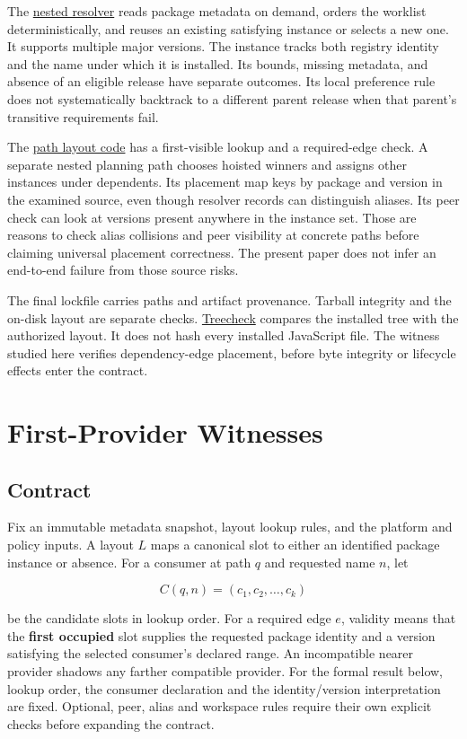 \documentclass[
  11pt,
  letterpaper,
]{article}
\begin{document}
The \href{../../crates/jhol-core/src/jagr_nest.rs}{nested resolver}
reads package metadata on demand, orders the worklist deterministically,
and reuses an existing satisfying instance or selects a new one. It
supports multiple major versions. The instance tracks both registry
identity and the name under which it is installed. Its bounds, missing
metadata, and absence of an eligible release have separate outcomes. Its
local preference rule does not systematically backtrack to a different
parent release when that parent's transitive requirements fail.

The \href{../../crates/jhol-core/src/layout.rs}{path layout code} has a
first-visible lookup and a required-edge check. A separate nested
planning path chooses hoisted winners and assigns other instances under
dependents. Its placement map keys by package and version in the
examined source, even though resolver records can distinguish aliases.
Its peer check can look at versions present anywhere in the instance
set. Those are reasons to check alias collisions and peer visibility at
concrete paths before claiming universal placement correctness. The
present paper does not infer an end-to-end failure from those source
risks.

The final lockfile carries paths and artifact provenance. Tarball
integrity and the on-disk layout are separate checks.
\href{../../crates/jhol-treecheck/src/lib.rs}{Treecheck} compares the
installed tree with the authorized layout. It does not hash every
installed JavaScript file. The witness studied here verifies
dependency-edge placement, before byte integrity or lifecycle effects
enter the contract.

\section{First-Provider Witnesses}\label{first-provider-witnesses}

\subsection{Contract}\label{contract}

Fix an immutable metadata snapshot, layout lookup rules, and the
platform and policy inputs. A layout \(L\) maps a canonical slot to
either an identified package instance or absence. For a consumer at path
\(q\) and requested name \(n\), let

\[C(q,n)=(c_1,c_2,\ldots,c_k)\]

be the candidate slots in lookup order. For a required edge \(e\),
validity means that the \textbf{first occupied} slot supplies the
requested package identity and a version satisfying the selected
consumer's declared range. An incompatible nearer provider shadows any
farther compatible provider. For the formal result below, lookup order,
the consumer declaration and the identity/version interpretation are
fixed. Optional, peer, alias and workspace rules require their own
explicit checks before expanding the contract.
\end{document}
